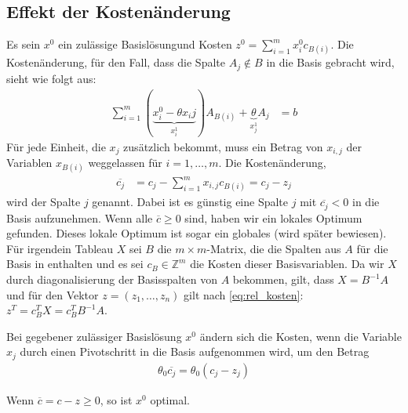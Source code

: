 \subsection{Effekt der Kostenänderung}
Es sein $x^0$ ein zulässige Basislösungund Kosten $z^0 = \sum_{i=1}^m x_i^0 c_{B(i)}$. Die Kostenänderung, für den Fall, dass die Spalte $A_j \notin B$ in die Basis gebracht wird, sieht wie folgt aus:
\begin{align*}
\sum_{i=1}^m (\underbrace{ x_i^0 - \theta x_ij }_{x_i^1}) A_{B(i)} + \underbrace{\theta}_{x_j^1} A_j &= b
\end{align*}
Für jede Einheit, die $x_j$ zusätzlich bekommt, muss ein Betrag von $x_{i,j}$ der Variablen $x_{B(i)}$ weggelassen für $i=1,\dotsc,m$. Die Kostenänderung,
\begin{align}
\overline{c_j} &= c_j - \sum_{i=1}^m x_{i,j} c_{B(i)} = c_j - z_j \label{eq:rel_kosten}
\end{align}
wird  der Spalte $j$ genannt. Dabei ist es günstig eine Spalte $j$ mit $\overline{c_j} < 0$ in die Basis aufzunehmen. Wenn alle $\overline{c} \geq 0$ sind, haben wir ein lokales Optimum gefunden. Dieses lokale Optimum ist sogar ein globales (wird später bewiesen).
Für irgendein Tableau $X$ sei $B$ die $m \times m$-Matrix, die die Spalten aus $A$ für die Basis in enthalten und es sei $c_B \in \mathbb Z^m$ die Kosten dieser Basisvariablen. Da wir $X$ durch diagonalisierung der Basisspalten von $A$ bekommen, gilt, dass $X=B^{-1}A$ und für den Vektor $z=(z_1,\dotsc,z_n)$ gilt nach \eqref{eq:rel_kosten}:
$z^T = c_B^TX = c_B^TB^{-1}A$.
\begin{theorem}
Bei gegebener zulässiger Basislösung $x^0$ ändern sich die Kosten, wenn die Variable $x_j$ durch einen Pivotschritt in die Basis aufgenommen wird, um den Betrag
\begin{align*}
\theta_0 \overline{c_j} = \theta_0 (c_j - z_j)
\end{align*}
\end{theorem}
Wenn $\overline{c} = c - z \geq 0$, so ist $x^0$ optimal.
